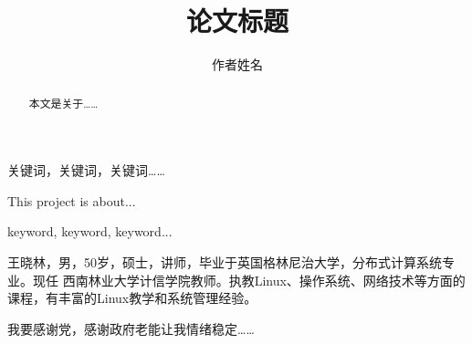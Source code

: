 \documentclass{swfuthesis}
\title{论文标题}
\author{作者姓名}
\begin{document}
\maketitle

\begin{abstract} %
  本文是关于……
\end{abstract}

\begin{keyword} %
  关键词，关键词，关键词……
\end{keyword}

\begin{EAbstract} %
  This project is about...
\end{EAbstract}

\begin{EKeyword} %
  keyword, keyword, keyword...
\end{EKeyword}

\tableofcontents     %
\listoffigures       %
\listoftables        %
\cleardoublepage %






\appendix %
\makebib %

\begin{advisorInfo} %
  王晓林，男，50岁，硕士，讲师，毕业于英国格林尼治大学，分布式计算系统专业。现任
  西南林业大学计信学院教师。执教Linux、操作系统、网络技术等方面的课程，有丰富的Linux教学和系统管理经验。
\end{advisorInfo}

\begin{acknowledgment} %
  我要感谢党，感谢政府老能让我情绪稳定……
\end{acknowledgment}

\singlespacing

\end{document}

